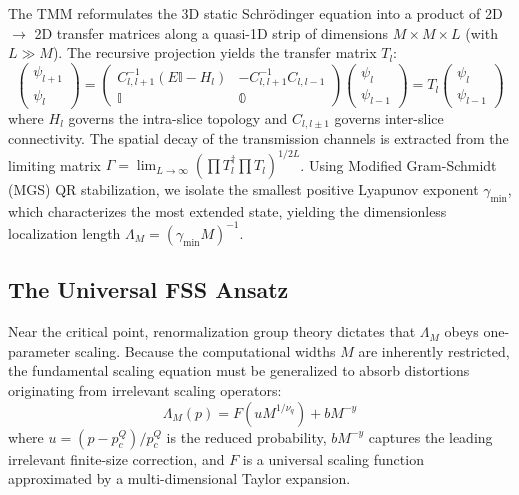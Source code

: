 \documentclass[11pt,a4paper]{article}
\begin{document}
The TMM reformulates the 3D static Schrödinger equation into a product of 2D $\to$ 2D transfer matrices along a quasi-1D strip of dimensions $M \times M \times L$ (with $L \gg M$). The recursive projection yields the transfer matrix $T_l$:
\begin{equation}
\begin{pmatrix} \psi_{l+1} \\ \psi_l \end{pmatrix} = \begin{pmatrix} C_{l, l+1}^{-1}(E \mathbb{I} - H_l) & -C_{l, l+1}^{-1} C_{l, l-1} \\ \mathbb{I} & \mathbb{0} \end{pmatrix} \begin{pmatrix} \psi_l \\ \psi_{l-1} \end{pmatrix} = T_l \begin{pmatrix} \psi_l \\ \psi_{l-1} \end{pmatrix}
\end{equation}
where $H_l$ governs the intra-slice topology and $C_{l, l\pm1}$ governs inter-slice connectivity. The spatial decay of the transmission channels is extracted from the limiting matrix $\Gamma = \lim_{L \to \infty} ( \prod T_l^\dagger \prod T_l )^{1/2L}$. Using Modified Gram-Schmidt (MGS) QR stabilization, we isolate the smallest positive Lyapunov exponent $\gamma_{\text{min}}$, which characterizes the most extended state, yielding the dimensionless localization length $\Lambda_M = (\gamma_{\text{min}} M)^{-1}$.

\subsection{The Universal FSS Ansatz}

Near the critical point, renormalization group theory dictates that $\Lambda_M$ obeys one-parameter scaling. Because the computational widths $M$ are inherently restricted, the fundamental scaling equation must be generalized to absorb distortions originating from irrelevant scaling operators:
\begin{equation}
\Lambda_M(p) = F\left( u M^{1/\nu_q} \right) + b M^{-y}
\end{equation}
where $u = (p - p_c^Q)/p_c^Q$ is the reduced probability, $b M^{-y}$ captures the leading irrelevant finite-size correction, and $F$ is a universal scaling function approximated by a multi-dimensional Taylor expansion.
\end{document}
